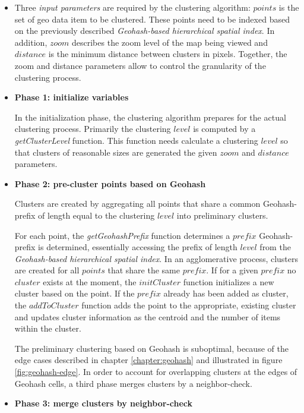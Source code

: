 \begin{itemize}

\item Three \textit{input parameters} are required by the clustering algorithm: $points$ is the set of geo data item to be clustered. These points need to be indexed based on the previously described \textit{Geohash-based hierarchical spatial index}. In addition, $zoom$ describes the zoom level of the map being viewed and $distance$ is the minimum distance between clusters in pixels. Together, the zoom and distance parameters allow to control the granularity of the clustering process.

\item \textbf{Phase 1: initialize variables}

In the initialization phase, the clustering algorithm prepares for the actual clustering process. Primarily the clustering $level$ is computed by a \textit{getClusterLevel} function. This function needs calculate a clustering $level$ so that clusters of reasonable sizes are generated the given $zoom$ and $distance$ parameters.

\item \textbf{Phase 2: pre-cluster points based on Geohash}

Clusters are created by aggregating all points that share a common Geohash-prefix of length equal to the clustering $level$ into preliminary clusters.

For each point, the \textit{getGeohashPrefix} function determines a $prefix$ Geohash-prefix is determined, essentially accessing the prefix of length $level$ from the \textit{Geohash-based hierarchical spatial index}. In an agglomerative process, clusters are created for all $points$ that share the same $prefix$. If for a given $prefix$ no $cluster$ exists at the moment, the $initCluster$ function initializes a new cluster based on the point. If the $prefix$ already has been added as cluster, the $addToCluster$ function adds the point to the appropriate, existing cluster and updates cluster information as the centroid and the number of items within the cluster.

The preliminary clustering based on Geohash is suboptimal, because of the edge cases described in chapter \ref{chapter:geohash} and illustrated in figure \ref{fig:geohash-edge}. In order to account for overlapping clusters at the edges of Geohash cells, a third phase merges clusters by a neighbor-check.

\item \textbf{Phase 3: merge clusters by neighbor-check}


\end{itemize}
